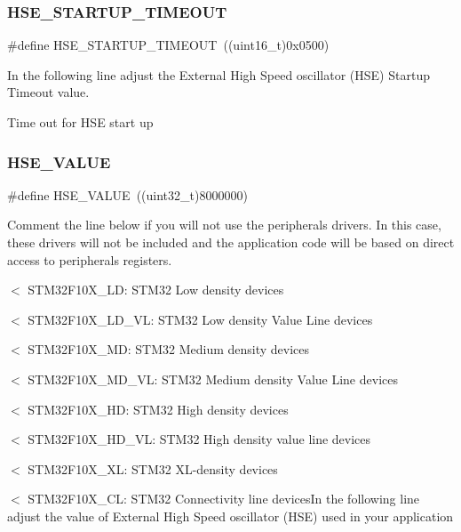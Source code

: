 \subsubsection{\texorpdfstring{HSE\_STARTUP\_TIMEOUT}{HSE\_STARTUP\_TIMEOUT}}
{\footnotesize\ttfamily \#define H\+S\+E\+\_\+\+S\+T\+A\+R\+T\+U\+P\+\_\+\+T\+I\+M\+E\+O\+UT~((uint16\+\_\+t)0x0500)}



In the following line adjust the External High Speed oscillator (H\+SE) Startup Timeout value. 

Time out for H\+SE start up \mbox{\label{group___library__configuration__section_gaeafcff4f57440c60e64812dddd13e7cb}} 
\subsubsection{\texorpdfstring{HSE\_VALUE}{HSE\_VALUE}}
{\footnotesize\ttfamily \#define H\+S\+E\+\_\+\+V\+A\+L\+UE~((uint32\+\_\+t)8000000)}



Comment the line below if you will not use the peripherals drivers. In this case, these drivers will not be included and the application code will be based on direct access to peripherals registers. 

$<$ S\+T\+M32\+F10\+X\+\_\+\+LD\+: S\+T\+M32 Low density devices

$<$ S\+T\+M32\+F10\+X\+\_\+\+L\+D\+\_\+\+VL\+: S\+T\+M32 Low density Value Line devices

$<$ S\+T\+M32\+F10\+X\+\_\+\+MD\+: S\+T\+M32 Medium density devices

$<$ S\+T\+M32\+F10\+X\+\_\+\+M\+D\+\_\+\+VL\+: S\+T\+M32 Medium density Value Line devices

$<$ S\+T\+M32\+F10\+X\+\_\+\+HD\+: S\+T\+M32 High density devices

$<$ S\+T\+M32\+F10\+X\+\_\+\+H\+D\+\_\+\+VL\+: S\+T\+M32 High density value line devices

$<$ S\+T\+M32\+F10\+X\+\_\+\+XL\+: S\+T\+M32 X\+L-\/density devices

$<$ S\+T\+M32\+F10\+X\+\_\+\+CL\+: S\+T\+M32 Connectivity line devices\+In the following line adjust the value of External High Speed oscillator (H\+SE) used in your application

